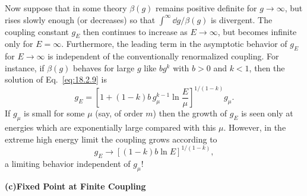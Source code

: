 Now suppose that in some theory $\beta(g)$ remains positive definite for
$g\to\infty$, but rises slowly enough (or decreases) so that $\int^\infty \dd g/\beta(g)$ is
divergent. The coupling constant $g_E$ then continues to increase as $E\to\infty$,
but becomes infinite only for $E=\infty$. Furthermore, the leading term in the
asymptotic behavior of $g_E$ for $E\to\infty$ is independent of the conventionally
renormalized coupling. For instance, if $\beta(g)$ behaves for large $g$ like $bg^k$
with $b>0$ and $k<1$, then the solution of Eq.\ \eqref{eq:18.2.9} is
\begin{equation}
g_E=\left[1+(1-k)b\,g_\mu^{k-1}\ln\frac{E}{\mu}\right]^{1/(1-k)}g_\mu.
\label{eq:18.3.9}
\end{equation}
If $g_\mu$ is small for some $\mu$ (say, of order $m$) then the growth of $g_E$ is
seen only at energies which are exponentially large compared with this $\mu$.
However, in the extreme high energy limit the coupling grows according
to
\begin{equation}
g_E\to[(1-k)b\ln E]^{1/(1-k)},
\label{eq:18.3.10}
\end{equation}
a limiting behavior independent of $g_\mu$!

\medskip
\noindent\textbf{(c)\quad Fixed Point at Finite Coupling}

